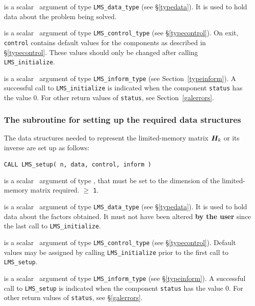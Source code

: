 \documentclass{galahad}
\newcommand{\packagename}{LMS}
\begin{document}
\vspace*{-3mm}
\begin{description}

 is a scalar \intentinout\ argument of type
{\tt \packagename\_data\_type}
(see \S\ref{typedata}). It is used to hold data about the problem being
solved.

 is a scalar \intentout\ argument of type
{\tt \packagename\_control\_type}
(see \S\ref{typecontrol}).
On exit, {\tt control} contains default values for the components as
described in \S\ref{typecontrol}.
These values should only be changed after calling
{\tt \packagename\_initialize}.

 is a scalar \intentout\ argument of type
{\tt \packagename\_inform\_type}
(see Section~\ref{typeinform}). A successful call to
{\tt \packagename\_initialize}
is indicated when the  component {\tt status} has the value 0.
For other return values of {\tt status}, see Section~\ref{galerrors}.

\end{description}


\subsubsection{The subroutine for setting up the required data structures}
The data structures needed to represent the limited-memory matrix ${\bm{H}}_k$
or its inverse are set up as follows:
\vspace*{1mm}

\hspace{8mm}
{\tt CALL \packagename\_setup(  n, data, control, inform )}

\vspace*{-3mm}
\begin{description}
 is a scalar \intentin\ argument of type \integer,
that must be set to the dimension of the limited-memory matrix required.
 $\geq$ {\tt 1}.

 is a scalar \intentinout\ argument of type
{\tt \packagename\_data\_type}
(see \S\ref{typedata}). It is used to hold data about the factors obtained.
It must not have been altered {\bf by the user} since the last call to
{\tt \packagename\_initialize}.

 is a scalar \intentin\ argument of type
{\tt \packagename\_control\_type}
(see \S\ref{typecontrol}). Default values may be assigned by calling
{\tt \packagename\_initialize} prior to the first call to
{\tt \packagename\_setup}.

 is a scalar \intentout\ argument of type
{\tt \packagename\_inform\_type}
(see \S\ref{typeinform}). A successful call to
{\tt \packagename\_setup}
is indicated when the  component {\tt status} has the value 0.
For other return values of {\tt status}, see \S\ref{galerrors}.

\end{description}
\end{document}
